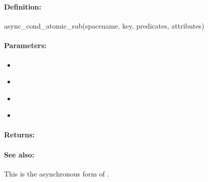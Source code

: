 \pagebreak
\subsubsection{}
\label{api:ruby:async_cond_atomic_sub}


\paragraph{Definition:}
\begin{rubycode}
async_cond_atomic_sub(spacename, key, predicates, attributes)
\end{rubycode}

\paragraph{Parameters:}
\begin{itemize}[noitemsep]
\item {}\\

\item {}\\

\item {}\\

\item {}\\

\end{itemize}

\paragraph{Returns:}


\paragraph{See also:}  This is the asynchronous form of .

\pagebreak
\subsubsection{}
\label{api:ruby:group_atomic_sub}


